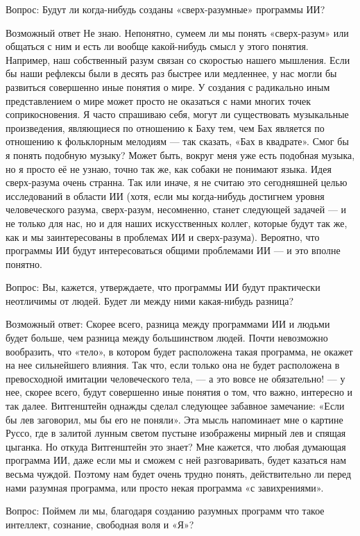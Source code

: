 \documentclass[../main.tex]{subfiles}
\begin{document}
Вопрос: Будут ли когда-нибудь созданы «сверх-разумные» программы ИИ?

Возможный ответ Не знаю. Непонятно, сумеем ли мы понять «сверх-разум» или общаться с ним и есть ли вообще какой-нибудь смысл у этого понятия. Например, наш собственный разум связан со скоростью нашего мышления. Если бы наши рефлексы были в десять раз быстрее или медленнее, у нас могли бы развиться совершенно иные понятия о мире. У создания с радикально иным представлением о мире может просто не оказаться с нами многих точек соприкосновения. Я часто спрашиваю себя, могут ли существовать музыкальные произведения, являющиеся по отношению к Баху тем, чем Бах является по отношению к фольклорным мелодиям --- так сказать, «Бах в квадрате». Смог бы я понять подобную музыку? Может быть, вокруг меня уже есть подобная музыка, но я просто её не узнаю, точно так же, как собаки не понимают языка. Идея сверх-разума очень странна. Так или иначе, я не считаю это сегодняшней целью исследований в области ИИ (хотя, если мы когда-нибудь достигнем уровня человеческого разума, сверх-разум, несомненно, станет следующей задачей --- и не только для нас, но и для наших искусственных коллег, которые будут так же, как и мы заинтересованы в проблемах ИИ и сверх-разума). Вероятно, что программы ИИ будут интересоваться общими проблемами ИИ --- и это вполне понятно.

Вопрос: Вы, кажется, утверждаете, что программы ИИ будут практически неотличимы от людей. Будет ли между ними какая-нибудь разница?

Возможный ответ: Скорее всего, разница между программами ИИ и людьми будет больше, чем разница между большинством людей. Почти невозможно вообразить, что «тело», в котором будет расположена такая программа, не окажет на нее сильнейшего влияния. Так что, если только она не будет расположена в превосходной имитации человеческого тела, --- а это вовсе не обязательно! --- у нее, скорее всего, будут совершенно иные понятия о том, что важно, интересно и так далее. Витгенштейн однажды сделал следующее забавное замечание: «Если бы лев заговорил, мы бы его не поняли». Эта мысль напоминает мне о картине Руссо, где в залитой лунным светом пустыне изображены мирный лев и спящая цыганка. Но откуда Витгенштейн это знает? Мне кажется, что любая думающая программа ИИ, даже если мы и сможем с ней разговаривать, будет казаться нам весьма чуждой. Поэтому нам будет очень трудно понять, действительно ли перед нами разумная программа, или просто некая программа «с завихрениями».

Вопрос: Поймем ли мы, благодаря созданию разумных программ что такое интеллект, сознание, свободная воля и «Я»?
\end{document}

